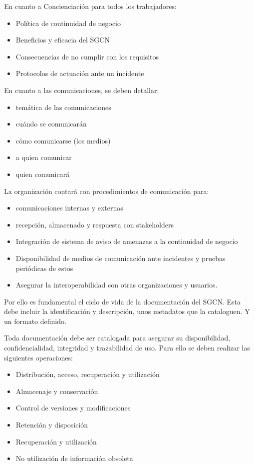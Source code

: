         En cuanto a Concienciación para todos los trabajadores:
        \begin{itemize}
            \item Política de continuidad de negocio
            \item Beneficios y eficacia del SGCN
            \item Consecuencias de no cumplir con los requisitos
            \item Protocolos de actuación ante un incidente
        \end{itemize}

        En cuanto a las comunicaciones, se deben detallar:
        \begin{itemize}
            \item temática de las comunicaciones
            \item cuándo se comunicarán
            \item cómo comunicarse (los medios)
            \item a quien comunicar
            \item quien comunicará
        \end{itemize}

        La organización contará con procedimientos de comunicación para:
        \begin{itemize}
            \item comunicaciones internas y externas
            \item recepción, almacenado y respuesta con stakeholders
            \item Integración de sistema de aviso de amenazas a la continuidad de negocio
            \item Disponibilidad de medios de comunicación ante incidentes y pruebas periódicas de estos
            \item Asegurar la interoperabilidad con otras organizaciones y usuarios.
        \end{itemize}

        Por ello es fundamental el ciclo de vida de la documentación del SGCN. Esta debe incluir la identificación y descripción, unos metadatos que la cataloguen. Y un formato definido.

        Toda documentación debe ser catalogada para asegurar su disponibilidad, confidencialidad, integridad y trazabilidad de uso. Para ello se deben realizar las siguientes operaciones:
        \begin{itemize}
            \item Distribución, acceso, recuperación y utilización
            \item Almacenaje y conservación
            \item Control de versiones y modificaciones
            \item Retención y disposición
            \item Recuperación y utilización
            \item No utilización de información obsoleta
        \end{itemize}

